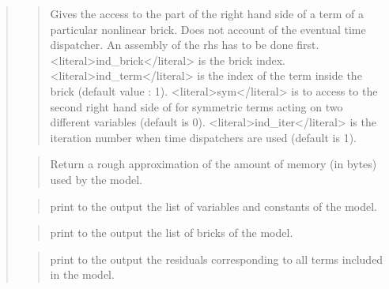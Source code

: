 \documentclass[a4paper,11pt,english]{sphinxmanual}
\begin{document}
\begin{quote}
\begin{quote}
\sphinxAtStartPar
Gives the access to the part of the right hand side of a term
of a particular nonlinear brick. Does not account of the eventual
time dispatcher. An assembly of the rhs has to be done first.
\textless{}literal\textgreater{}ind\_brick\textless{}/literal\textgreater{} is the brick index. \textless{}literal\textgreater{}ind\_term\textless{}/literal\textgreater{} is the index of the
term inside the brick (default value : 1).
\textless{}literal\textgreater{}sym\textless{}/literal\textgreater{} is to access to the second right hand side of for symmetric
terms acting on two different variables (default is 0).
\textless{}literal\textgreater{}ind\_iter\textless{}/literal\textgreater{} is the iteration number when time dispatchers are
used (default is 1).
\end{quote}

\sphinxAtStartPar
{}
\begin{quote}

\sphinxAtStartPar
Return a rough approximation of the amount of memory (in bytes) used by
the model.
\end{quote}

\sphinxAtStartPar
{}
\begin{quote}

\sphinxAtStartPar
print to the output the list of variables and constants of the model.
\end{quote}

\sphinxAtStartPar
{}
\begin{quote}

\sphinxAtStartPar
print to the output the list of bricks of the model.
\end{quote}

\sphinxAtStartPar
{}
\begin{quote}

\sphinxAtStartPar
print to the output the residuals corresponding to all terms
included in the model.
\end{quote}

\sphinxAtStartPar
{}
\begin{quote}


\end{quote}
\end{quote}
\end{document}
